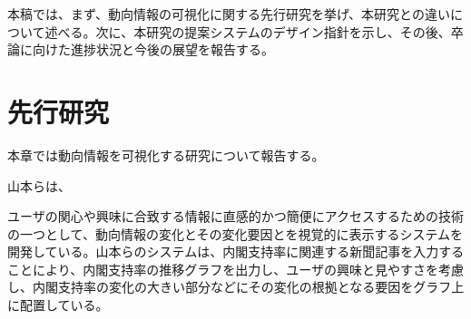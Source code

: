 \documentclass{matsushita-zemi}
\begin{document}

本稿では、まず、動向情報の可視化に関する先行研究を挙げ、本研究との違いについて述べる。次に、本研究の提案システムのデザイン指針を示し、その後、卒論に向けた進捗状況と今後の展望を報告する。

\section{先行研究}
\label{relatedworks} 
本章では動向情報を可視化する研究について報告する。

山本らは、

ユーザの関心や興味に合致する情報に直感的かつ簡便にアクセスするための技術の一つとして、動向情報の変化とその変化要因とを視覚的に表示するシステムを開発している\cite{Tagged_corpus}。山本らのシステムは、内閣支持率に関連する新聞記事を入力することにより、内閣支持率の推移グラフを出力し、ユーザの興味と見やすさを考慮し、内閣支持率の変化の大きい部分などにその変化の根拠となる要因をグラフ上に配置している。


\end{document}
